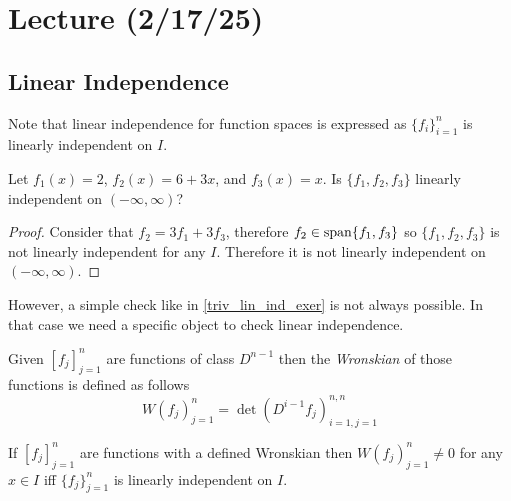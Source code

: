 \documentclass[notes]{subfiles}
\begin{document}
\setcounter{section}{8}
\section{Lecture (2/17/25)}
\subsection{Linear Independence}
Note that linear independence for function spaces is expressed as $\{ f_i \}_{i = 1}^n$ is linearly independent on $I$.

\begin{exercise} \label{triv_lin_ind_exer}
    Let $f_1(x) = 2$, $f_2(x) = 6 + 3x$, and $f_3(x) = x$. Is $\{ f_1, f_2, f_3 \}$ linearly independent on $(-\infty, \infty)$?
\end{exercise}
\begin{proof}
    Consider that $f_2 = 3f_1 + 3f_3$, therefore $f_2 \in \operatorname{span}\{ f_1, f_3 \}$ so $\{ f_1, f_2, f_3 \}$ is not linearly independent for any $I$. Therefore it is not linearly independent on $(-\infty, \infty)$.
\end{proof}

However, a simple check like in \cref{triv_lin_ind_exer} is not always possible. In that case we need a specific object to check linear independence.

\begin{definition}[Wronskian]
    Given $[f_j]_{j = 1}^n$ are functions of class $D^{n - 1}$ then the \textit{Wronskian} of those functions is defined as follows
    \[
        W(f_j)_{j = 1}^n = \det(D^{i - 1}f_j)_{i = 1, j = 1}^{n, n}
    \]
\end{definition}

\begin{theorem} \label{wronskian_theorem}
    If $[f_j]_{j = 1}^n$ are functions with a defined Wronskian then $W(f_j)_{j = 1}^n \neq 0$ for any $x \in I$ iff $\{ f_j \}_{j = 1}^n$ is linearly independent on $I$.
\end{theorem}
\end{document}
